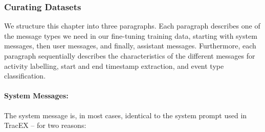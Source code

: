 \subsubsection{Curating Datasets}\label{sec:curating_data}
We structure this chapter into three paragraphs. Each paragraph describes one of the message types we need in our fine-tuning training data, starting with system messages, then user messages, and finally, assistant messages. Furthermore, each paragraph sequentially describes the characteristics of the different messages for activity labelling, start and end timestamp extraction, and event type classification.
\paragraph{System Messages:} The system message is, in most cases, identical to the system prompt used in TracEX – for two reasons:
